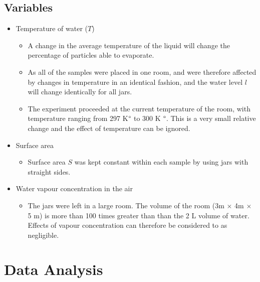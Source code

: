 \documentclass[12pt,letterpaper,final]{report}
\begin{document}
\subsection{Variables}
\begin{itemize}
\item Temperature of water ($T$)
\begin{itemize}
\item A change in the average temperature of the liquid will change the percentage of particles able to evaporate.
\item As all of the samples were placed in one room, and were therefore affected by changes in temperature in an identical fashion, and the water level $l$ will change identically for all jars.
\item The experiment proceeded at the current temperature of the room, with temperature ranging from 297 K$\degree$ to 300 K $\degree$. This is a very small relative change and the effect of temperature can be ignored. 
\end{itemize}
\item Surface area
\begin{itemize}
\item Surface area $S$ was kept constant within each sample by using jars with straight sides. 
\end{itemize}

\item Water vapour concentration in the air
\begin{itemize}
\item The jars were left in a large room. The volume of the room (3m $\times$ 4m $\times$ 5 m) is more than 100 times greater than than the 2 L volume of water. Effects of vapour concentration can therefore be considered to as negligible. 
\end{itemize}


\end{itemize}
\section{Data Analysis}
\end{document}
